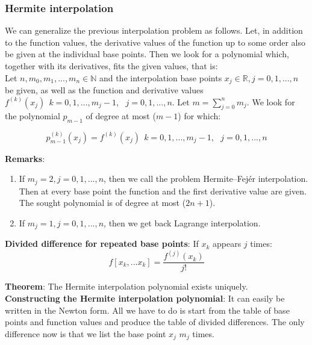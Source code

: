 \documentclass[margin=0px]{article}
\begin{document}
\subsubsection{Hermite interpolation}
We can generalize the previous interpolation problem as follows. Let, in addition to the function values, the derivative values of the function up to some order
also be given at the individual base points. Then we look for a polynomial which, together with its derivatives,
fits the given values, that is:\\

\noindent Let $n,m_{0},m_{1},..., m_{n} \in \mathbb{N}$ and the interpolation base points $x_{j} \in \mathbb{R}, j=0,1,...,n$ be given, as well as
the function and derivative values $f^{(k)}(x_{j}) \ \ k=0,1,...,m_{j}-1, \ \ \ j=0,1,...,n$. Let
$m = \displaystyle\sum_{j=0}^{n}m_{j}$. We look for the polynomial $p_{m-1}$ of degree at most ($m-1$) for which:

\begin{displaymath}
    p^{(k)}_{m-1}(x_{j}) = f^{(k)}(x_{j}) \ \ k=0,1,...,m_{j}-1, \ \ \ j=0,1,...,n
\end{displaymath}

\noindent \textbf{Remarks}:
\begin{enumerate}
    \item	If $m_{j}=2, j=0,1,...,n$, then we call the problem Hermite--Fejér interpolation. Then at every base point
          the function and the first derivative value are given. The sought polynomial is of degree at most ($2n+1$).

    \item	If $m_{j}=1, j=0,1,...,n$, then we get back Lagrange interpolation.
\end{enumerate}

\noindent \textbf{Divided difference for repeated base points}: If $x_{k}$ appears $j$ times:
\begin{displaymath}
    f[x_{k}, ... x_{k}] = \frac{f^{(j)}(x_{k})}{j!}
\end{displaymath}

\noindent \textbf{Theorem}: The Hermite interpolation polynomial exists uniquely.\\

\noindent \textbf{Constructing the Hermite interpolation polynomial}: It can easily be written in the Newton form. All we
have to do is start from the table of base points and function values and produce the table of divided differences.
The only difference now is that we list the base point $x_{j}$ $m_{j}$ times.\\
\end{document}
